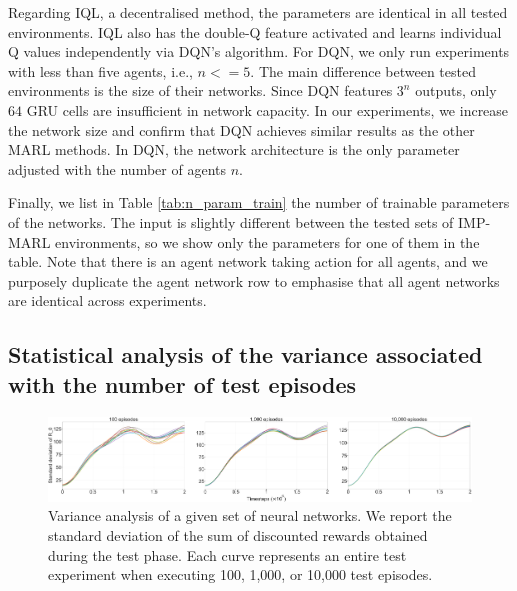 Regarding IQL, a decentralised method, the parameters are identical in all tested environments.
IQL also has the double-Q feature activated and learns individual Q values independently via DQN's algorithm.
For DQN, we only run experiments with less than five agents, i.e., $n<=5$.
The main difference between tested environments is the size of their networks. 
Since DQN features $3^n$ outputs, only $64$ GRU cells are insufficient in network capacity. 
In our experiments, we increase the network size and confirm that DQN achieves similar results as the other MARL methods.
In DQN, the network architecture is the only parameter adjusted with the number of agents $n$.

Finally, we list in Table \ref{tab:n_param_train} the number of trainable parameters of the networks.
The input is slightly different between the tested sets of IMP-MARL environments, so we show only the parameters for one of them in the table.
Note that there is an agent network taking action for all agents, and we purposely duplicate the agent network row to emphasise that all agent networks are identical across experiments.

\subsection{Statistical analysis of the variance associated with the number of test episodes}
\label{sec:ch5_appendix_variance}

\begin{figure}
\centering
    \includegraphics[width=\textwidth]{figures/ch5/variance_analysis.pdf}
\caption{
Variance analysis of a given set of neural networks.
We report the standard deviation of the sum of discounted rewards obtained during the test phase.
Each curve represents an entire test experiment when executing 100, 1,000, or 10,000 test episodes.
}
\label{fig:variance_details}
\end{figure}

